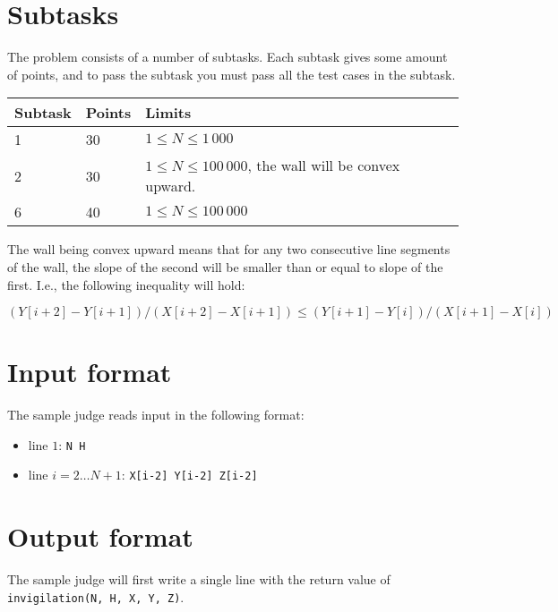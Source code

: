 \section*{Subtasks}
The problem consists of a number of subtasks. Each subtask gives some amount of points, and to pass
the subtask you must pass all the test cases in the subtask.

\begin{tabular}{|l|l|l|}
  \hline
  \textbf{Subtask} & \textbf{Points} & \textbf{Limits} \\ \hline
  1 & 30 & $1 \le N \le 1\,000$ \\ \hline
  2 & 30 & $1 \le N \le 100\,000$, the wall will be convex upward. \\ \hline
  6 & 40 & $1 \le N \le 100\,000$ \\ \hline
\end{tabular}

The wall being convex upward means that for any two consecutive line segments of the wall, the slope of the second will be smaller than or equal to slope of the first.
I.e., the following inequality will hold:

$(Y[i+2] - Y[i+1]) / (X[i+2] - X[i+1]) \le (Y[i+1] - Y[i]) / (X[i+1] - X[i])$

\section*{Input format}
The sample judge reads input in the following format:

\begin{itemize}
  \item line $1$: \texttt{N H}
  \item line $i = 2 \dots N+1$: \texttt{X[i-2] Y[i-2] Z[i-2]}
\end{itemize}

\section*{Output format}
The sample judge will first write a single line with the return value of \texttt{invigilation(N, H, X, Y, Z)}.
